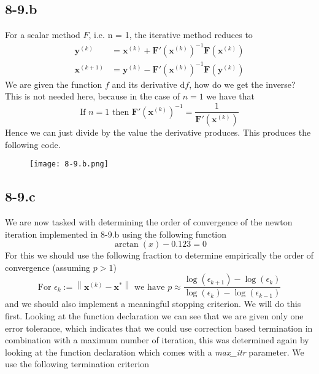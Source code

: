 \documentclass{article}
\newcommand\xk{\mathbf{x}^{\left(k\right)}}
\newcommand\xkn{\mathbf{x}^{\left(k+1\right)}}
\newcommand\yk{\mathbf{y}^{\left(k\right)}}
\begin{document}
\pagebreak

\subsection*{8-9.b} For a scalar method $F$, i.e. n = 1, the iterative method reduces to
\begin{align*}
    \yk &= \xk + \mathbf{F}'\left(\xk\right)^{-1}\mathbf{F}\left(\xk\right) \\
    \xkn &= \yk - \mathbf{F}'\left(\xk\right)^{-1}\mathbf{F}\left(\yk\right)
\end{align*}
We are given the function $f$ and its derivative $\mathrm{d}f$, how do we get the inverse? This is not needed here, because in the case of $n = 1$ we have that 
\begin{equation*}
    \text{If } n = 1\text{ then } \mathbf{F}'\left(\xk\right)^{-1} = \frac{1}{\mathbf{F}'\left(\xk\right)}
\end{equation*}
Hence we can just divide by the value the derivative produces. This produces the following code.

\begin{figure}[!hbt]
    \centering
\texttt{[image: 8-9.b.png]}
\end{figure}
\subsection*{8-9.c}
We are now tasked with determining the order of convergence of the newton iteration implemented in 8-9.b using the following function
\begin{equation*}
    \arctan\left(x\right) - 0.123 = 0
\end{equation*}
For this we should use the following fraction to determine empirically the order of convergence (assuming $p > 1$)
\begin{equation}
   \text{For } \epsilon_{k} := \left\lVert \xk -\mathbf{x}^{*}\right\rVert \text{ we have } p \approx \frac{\log\left(\epsilon_{k+1}\right)-\log\left(\epsilon_{k}\right)}{\log\left(\epsilon_{k}\right) - \log\left(\epsilon_{k-1}\right)}
\end{equation}
and we should also implement a meaningful stopping criterion. We will do this first. Looking at the function declaration we can see that we are given only one error tolerance, which indicates that we could use correction based termination in combination with a maximum number of iteration, this was determined again by looking at the function declaration which comes with a \textit{max\_itr} parameter. We use the following termination criterion
\end{document}
